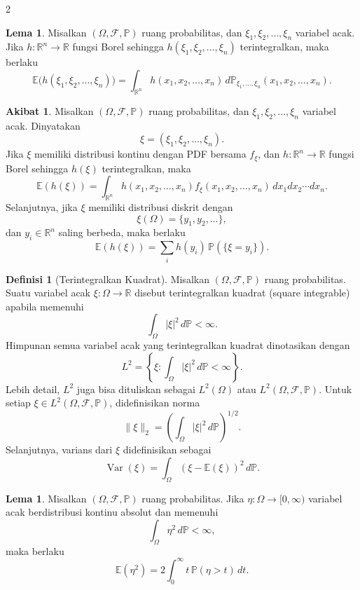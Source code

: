 \documentclass[a4paper,extrafontsizes, 9pt]{memoir}
\DeclareMathOperator{\Var}{Var}
\theoremstyle{definition}
\newtheorem{definisi}[kalstok]{Definisi}
\newtheorem{lemma}[kalstok]{Lema}
\newtheorem{akibat}[kalstok]{Akibat}
\theoremstyle{plain}
\theoremstyle{remark}
\begin{document}
\begin{multicols}{2}
  \begin{lemma}
    Misalkan $(\Omega,\mathcal{F},\mathbb{P})$ ruang probabilitas, dan
    $\xi_1,\xi_2,\ldots,\xi_n$ variabel acak. Jika $h:\mathbb{R}^n\to\mathbb{R}$ fungsi Borel
    sehingga $h(\xi_1,\xi_2,\ldots,\xi_n)$ terintegralkan, maka berlaku
    \[\mathbb{E}\bigl(h(\xi_1,\xi_2,\ldots,\xi_n)\bigr)
      =\int_{\mathbb{R}^n}h(x_1,x_2,\ldots,x_n)\,d\mathbb{P}_{\xi_1,\ldots,\xi_n}(x_1,x_2,\ldots,x_n).\]
  \end{lemma}

  \begin{akibat}
    Misalkan $(\Omega,\mathcal{F},\mathbb{P})$ ruang probabilitas, dan
    $\xi_1,\xi_2,\ldots,\xi_n$ variabel acak. Dinyatakan
    \[\xi=(\xi_1,\xi_2,\ldots,\xi_n).\]
    Jika $\xi$ memiliki distribusi kontinu dengan PDF bersama $f_{\xi}$, dan
    $h:\mathbb{R}^n\to\mathbb{R}$ fungsi Borel sehingga $h(\xi)$ terintegralkan, maka
    \[\mathbb{E}(h(\xi))=\int_{\mathbb{R}^n}h(x_1,x_2,\ldots,x_n)f_{\xi}(x_1,x_2,\ldots,x_n)\,dx_1dx_2\cdots dx_n.\]
    Selanjutnya, jika $\xi$ memiliki distribusi diskrit dengan
    \[\xi(\Omega)=\{y_1,y_2,\ldots\},\]
    dan $y_i\in\mathbb{R}^n$ saling berbeda, maka berlaku
    \[\mathbb{E}(h(\xi))=\sum_i h(y_i)\,\mathbb{P}(\{\xi=y_i\}).\]
  \end{akibat}

  \begin{definisi}[Terintegralkan Kuadrat]
    Misalkan $(\Omega,\mathcal{F},\mathbb{P})$ ruang probabilitas.
    Suatu variabel acak $\xi:\Omega\to\mathbb{R}$ disebut terintegralkan kuadrat
    (square integrable) apabila memenuhi
    \[\int_{\Omega}|\xi|^2\,d\mathbb{P}<\infty.\]
    Himpunan semua variabel acak yang terintegralkan kuadrat dinotasikan dengan
    \[L^2=\left\{\xi:\int_{\Omega}|\xi|^2\,d\mathbb{P}<\infty\right\}.\]
    Lebih detail, $L^2$ juga bisa dituliskan sebagai $L^2(\Omega)$ atau
    $L^2(\Omega,\mathcal{F},\mathbb{P})$. Untuk setiap $\xi\in L^2(\Omega,\mathcal{F},\mathbb{P})$,
    didefinisikan norma
    \[\|\xi\|_2=\left(\int_{\Omega}|\xi|^2\,d\mathbb{P}\right)^{1/2}.\]
    Selanjutnya, varians dari $\xi$ didefinisikan sebagai
    \[\Var(\xi)=\int_{\Omega}(\xi-\mathbb{E}(\xi))^2\,d\mathbb{P}.\]
  \end{definisi}

  \begin{lemma}
    Misalkan $(\Omega,\mathcal{F},\mathbb{P})$ ruang probabilitas. Jika
    $\eta:\Omega\to[0,\infty)$ variabel acak berdistribusi kontinu absolut dan memenuhi
    \[\int_{\Omega}\eta^2\,d\mathbb{P}<\infty,\]
    maka berlaku
    \[\mathbb{E}(\eta^2)=2\int_0^{\infty}t\,\mathbb{P}(\eta>t)\,dt.\]
  \end{lemma}


\end{multicols}
\end{document}
